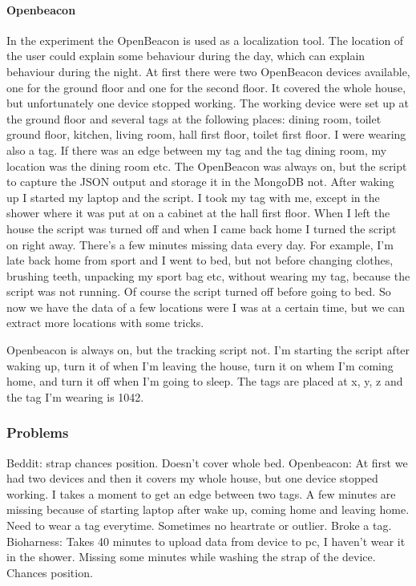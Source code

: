 			\paragraph{Openbeacon}
		 		In the experiment the OpenBeacon is used as a localization tool. The location of the user could explain some behaviour during the day, which can explain behaviour during the night. At first there were two OpenBeacon devices available, one for the ground floor and one for the second floor. It covered the whole house, but unfortunately one device stopped working. The working device were set up at the ground floor and several tags at the following places: dining room, toilet ground floor, kitchen, living room, hall first floor, toilet first floor. I were wearing also a tag. If there was an edge between my tag and the tag dining room, my location was the dining room etc. The OpenBeacon was always on, but the script to capture the JSON output and storage it in the MongoDB not. After waking up I started my laptop and the script. I took my tag with me, except in the shower where it was put at on a cabinet at the hall first floor. When I left the house the script was turned off and when I came back home I turned the script on right away. There's a few minutes missing data every day. For example, I'm late back home from sport and I went to bed, but not before changing clothes, brushing teeth, unpacking my sport bag etc, without wearing my tag, because the script was not running. Of course the script turned off before going to bed.
				So now we have the data of a few locations were I was at a certain time, but we can extract more locations with some tricks. 

				
				



				Openbeacon is always on, but the tracking script not. I'm starting the script after waking up, turn it of when I'm leaving the house, turn it on whem I'm coming home, and turn it off when I'm going to sleep. The tags are placed at x, y, z and the tag I'm wearing is 1042. 
		\subsubsection{Problems}
			Beddit: strap chances position. Doesn't cover whole bed. 
			Openbeacon: At first we had two devices and then it covers my whole house, but one device stopped working. I takes a moment to get an edge between two tags. A few minutes are missing because of starting laptop after wake up, coming home and leaving home. Need to wear a tag everytime. Sometimes no heartrate or outlier. Broke a tag.
			Bioharness: Takes 40 minutes to upload data from device to pc, I haven't wear it in the shower. Missing some minutes while washing the strap of the device. Chances position. 
